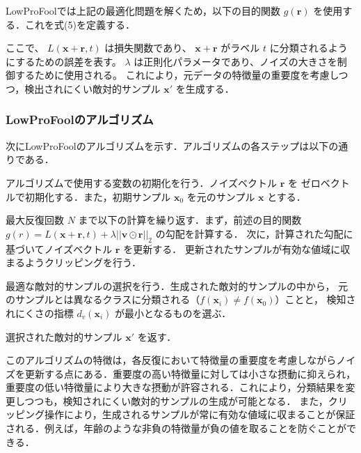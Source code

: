 LowProFoolでは上記の最適化問題を解くため，以下の目的関数 $g(\bm{r})$ を使用する．これを式(5)を定義する．


ここで、 $L(\bm{x}+\bm{r}, t)$ は損失関数であり、 $\bm{x}+\bm{r}$ がラベル $t$ に分類されるようにするための誤差を表す。 $\lambda$ は正則化パラメータであり、ノイズの大きさを制御するために使用される。
これにより，元データの特徴量の重要度を考慮しつつ，検出されにくい敵対的サンプル $\bm{x}'$ を生成する．

\subsubsection{LowProFoolのアルゴリズム}
次にLowProFoolのアルゴリズムを示す．アルゴリズムの各ステップは以下の通りである．
\begin{algorithm_step}
    \item[Step 1)] アルゴリズムで使用する変数の初期化を行う．ノイズベクトル $\bm{r}$ を
        ゼロベクトルで初期化する．また，初期サンプル $\bm{x}_0$ を元のサンプル $\bm{x}$ とする．
    
    \item[Step 2)] 最大反復回数 $N$ まで以下の計算を繰り返す．まず，前述の目的関数 
        $g(r) = L(\bm{x}+\bm{r}, t) + \lambda ||\bm{v} \odot \bm{r}||_2$ の勾配を計算する．
        次に，計算された勾配に基づいてノイズベクトル $\bm{r}$ を更新する．
        更新されたサンプルが有効な値域に収まるようクリッピングを行う．
    
    \item[Step 3)] 最適な敵対的サンプルの選択を行う．生成された敵対的サンプルの中から，
        元のサンプルとは異なるクラスに分類される（$f(\bm{x}_i) \neq f(\bm{x}_0)$）ことと，
        検知されにくさの指標 $d_v(\bm{x}_i)$ が最小となるものを選ぶ．
    
    \item[Step 4)] 選択された敵対的サンプル $\bm{x}'$ を返す．
    \end{algorithm_step}


このアルゴリズムの特徴は，各反復において特徴量の重要度を考慮しながらノイズを更新する点にある．重要度の高い特徴量に対しては小さな摂動に抑えられ，重要度の低い特徴量により大きな摂動が許容される．これにより，分類結果を変更しつつも，検知されにくい敵対的サンプルの生成が可能となる．
また，クリッピング操作により，生成されるサンプルが常に有効な値域に収まることが保証される．例えば，年齢のような非負の特徴量が負の値を取ることを防ぐことができる．


